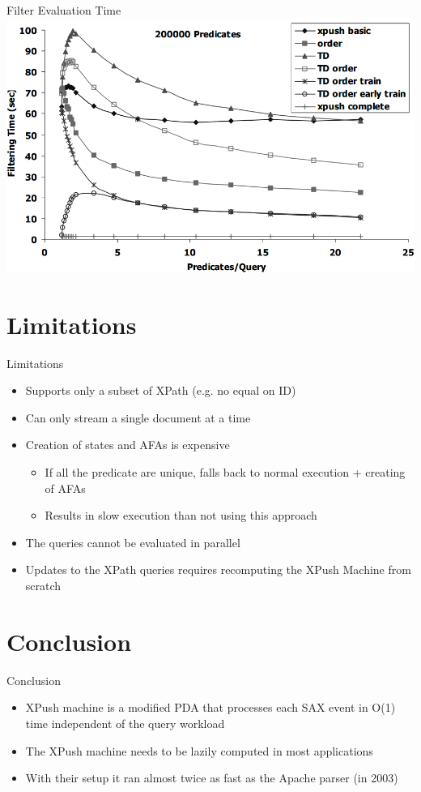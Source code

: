 \documentclass[mathserif,serif]{beamer}
\begin{document}
\begin{frame}{Filter Evaluation Time}
  \includegraphics[width=\textwidth]{filtertime}
\end{frame}

\section{Limitations}
\begin{frame}{Limitations}
  \begin{itemize}
    \item Supports only a subset of XPath (e.g. no equal on ID)
    \item Can only stream a single document at a time
    \item Creation of states and AFAs is expensive
    \begin{itemize}
      \item If all the predicate are unique, falls back to normal execution + creating of AFAs
      \item Results in slow execution than not using this approach
    \end{itemize}
    \item The queries cannot be evaluated in parallel
    \item Updates to the XPath queries requires recomputing the XPush Machine from scratch
  \end{itemize}
\end{frame}

\section{Conclusion}
\begin{frame}{Conclusion}
  \begin{itemize}
    \item XPush machine is a modified PDA that processes each SAX event in O(1) time independent of the query workload
    \item The XPush machine needs to be lazily computed in most applications
    \item With their setup it ran almost twice as fast as the Apache parser (in 2003)
  \end{itemize}
\end{frame}
\end{document}
